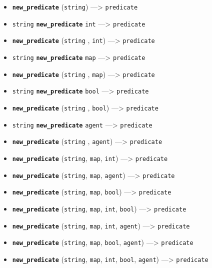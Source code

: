 \documentclass[]{book}
\providecommand{\tightlist}{%
  \setlength{\itemsep}{0pt}\setlength{\parskip}{0pt}}
\theoremstyle{definition}
\theoremstyle{definition}
\theoremstyle{definition}
\theoremstyle{remark}
\begin{document}
\begin{itemize}
\tightlist
\item
  \textbf{\texttt{new\_predicate}} (\texttt{string}) ---\textgreater{}
  \texttt{predicate}
\item
  \texttt{string} \textbf{\texttt{new\_predicate}} \texttt{int}
  ---\textgreater{} \texttt{predicate}
\item
  \textbf{\texttt{new\_predicate}} (\texttt{string} , \texttt{int})
  ---\textgreater{} \texttt{predicate}
\item
  \texttt{string} \textbf{\texttt{new\_predicate}} \texttt{map}
  ---\textgreater{} \texttt{predicate}
\item
  \textbf{\texttt{new\_predicate}} (\texttt{string} , \texttt{map})
  ---\textgreater{} \texttt{predicate}
\item
  \texttt{string} \textbf{\texttt{new\_predicate}} \texttt{bool}
  ---\textgreater{} \texttt{predicate}
\item
  \textbf{\texttt{new\_predicate}} (\texttt{string} , \texttt{bool})
  ---\textgreater{} \texttt{predicate}
\item
  \texttt{string} \textbf{\texttt{new\_predicate}} \texttt{agent}
  ---\textgreater{} \texttt{predicate}
\item
  \textbf{\texttt{new\_predicate}} (\texttt{string} , \texttt{agent})
  ---\textgreater{} \texttt{predicate}
\item
  \textbf{\texttt{new\_predicate}} (\texttt{string}, \texttt{map},
  \texttt{int}) ---\textgreater{} \texttt{predicate}
\item
  \textbf{\texttt{new\_predicate}} (\texttt{string}, \texttt{map},
  \texttt{agent}) ---\textgreater{} \texttt{predicate}
\item
  \textbf{\texttt{new\_predicate}} (\texttt{string}, \texttt{map},
  \texttt{bool}) ---\textgreater{} \texttt{predicate}
\item
  \textbf{\texttt{new\_predicate}} (\texttt{string}, \texttt{map},
  \texttt{int}, \texttt{bool}) ---\textgreater{} \texttt{predicate}
\item
  \textbf{\texttt{new\_predicate}} (\texttt{string}, \texttt{map},
  \texttt{int}, \texttt{agent}) ---\textgreater{} \texttt{predicate}
\item
  \textbf{\texttt{new\_predicate}} (\texttt{string}, \texttt{map},
  \texttt{bool}, \texttt{agent}) ---\textgreater{} \texttt{predicate}
\item
  \textbf{\texttt{new\_predicate}} (\texttt{string}, \texttt{map},
  \texttt{int}, \texttt{bool}, \texttt{agent}) ---\textgreater{}
  \texttt{predicate}
\end{itemize}
\end{document}
